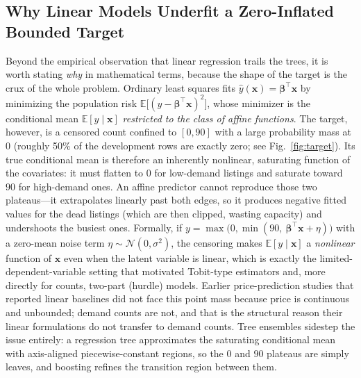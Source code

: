 \documentclass[journal]{IEEEtran}
\begin{document}
\subsection{Why Linear Models Underfit a Zero-Inflated Bounded Target}
\label{sec:linearcritique}
Beyond the empirical observation that linear regression trails the trees, it is
worth stating \emph{why} in mathematical terms, because the shape of the target
is the crux of the whole problem. Ordinary least squares fits
$\hat y(\mathbf{x}) = \boldsymbol{\beta}^{\top}\mathbf{x}$ by minimizing the
population risk $\mathbb{E}\big[(y-\boldsymbol{\beta}^{\top}\mathbf{x})^{2}\big]$,
whose minimizer is the conditional mean $\mathbb{E}[y\mid\mathbf{x}]$
\emph{restricted to the class of affine functions}. The target, however, is a
censored count confined to $[0,90]$ with a large probability mass at $0$
(roughly 50\% of the development rows are exactly zero; see
Fig.~\ref{fig:target}). Its true conditional mean is therefore an inherently
nonlinear, saturating function of the covariates: it must flatten to $0$ for
low-demand listings and saturate toward $90$ for high-demand ones. An affine
predictor cannot reproduce those two plateaus---it extrapolates linearly past
both edges, so it produces negative fitted values for the dead listings (which
are then clipped, wasting capacity) and undershoots the busiest ones. Formally,
if $y=\max\!\big(0,\min(90,\ \boldsymbol{\beta}^{\top}\mathbf{x}+\eta)\big)$ with
a zero-mean noise term $\eta\sim\mathcal{N}(0,\sigma^{2})$,
the censoring makes $\mathbb{E}[y\mid\mathbf{x}]$ a \emph{nonlinear} function of
$\mathbf{x}$ even when the latent variable is linear, which is exactly the
limited-dependent-variable setting that motivated Tobit-type estimators
\cite{tobin1958} and, more directly for counts, two-part (hurdle) models.
Earlier price-prediction studies that reported linear baselines
\cite{gunter2018,wang2017} did not face this point mass because price is
continuous and unbounded; demand counts are not, and that is the structural
reason their linear formulations do not transfer to demand counts. Tree ensembles
sidestep the issue entirely: a regression tree approximates the saturating
conditional mean with axis-aligned piecewise-constant regions, so the $0$ and
$90$ plateaus are simply leaves, and boosting refines the transition region
between them.
\end{document}
